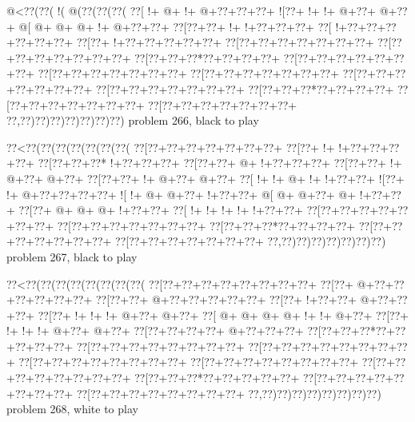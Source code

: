 \vbox{\vbox{\goo
\- @<\0??(\0??(\- !(\- @(\0??(\0??(\0??(
\0??[\- !+\- @+\- !+\- @+\0??+\0??+\0??+
\- ![\0??+\- !+\- !+\- @+\0??+\- @+\0??+
\- @[\- @+\- @+\- @+\- !+\- @+\0??+\0??+
\0??[\0??+\0??+\- !+\- !+\0??+\0??+\0??+
\0??[\- !+\0??+\0??+\0??+\0??+\0??+\0??+
\0??[\0??+\- !+\0??+\0??+\0??+\0??+\0??+
\0??[\0??+\0??+\0??+\0??+\0??+\0??+\0??+
\0??[\0??+\0??+\0??+\0??+\0??+\0??+\0??+
\0??[\0??+\0??+\0??*\0??+\0??+\0??+\0??+
\0??[\0??+\0??+\0??+\0??+\0??+\0??+\0??+
\0??[\0??+\0??+\0??+\0??+\0??+\0??+\0??+
\0??[\0??+\0??+\0??+\0??+\0??+\0??+\0??+
\0??[\0??+\0??+\0??+\0??+\0??+\0??+\0??+
\0??[\0??+\0??+\0??+\0??+\0??+\0??+\0??+
\0??[\0??+\0??+\0??*\0??+\0??+\0??+\0??+
\0??[\0??+\0??+\0??+\0??+\0??+\0??+\0??+
\0??[\0??+\0??+\0??+\0??+\0??+\0??+\0??+
\0??,\0??)\0??)\0??)\0??)\0??)\0??)\0??)
}
\hfil problem 266, black to play\hfil\break
}

\vbox{\vbox{\goo
\0??<\0??(\0??(\0??(\0??(\0??(\0??(\0??(
\0??[\0??+\0??+\0??+\0??+\0??+\0??+\0??+
\0??[\0??+\- !+\- !+\0??+\0??+\0??+\0??+
\0??[\0??+\0??+\0??*\- !+\0??+\0??+\0??+
\0??[\0??+\0??+\- @+\- !+\0??+\0??+\0??+
\0??[\0??+\0??+\- !+\- @+\0??+\- @+\0??+
\0??[\0??+\0??+\- !+\- @+\0??+\- @+\0??+
\0??[\- !+\- !+\- @+\- !+\- !+\0??+\0??+
\- ![\0??+\- !+\- @+\0??+\0??+\0??+\0??+
\- ![\- !+\- @+\- @+\0??+\- !+\0??+\0??+
\- @[\- @+\- @+\0??+\- @+\- !+\0??+\0??+
\0??[\0??+\- @+\- @+\- @+\- !+\0??+\0??+
\0??[\- !+\- !+\- !+\- !+\- !+\0??+\0??+
\0??[\0??+\0??+\0??+\0??+\0??+\0??+\0??+
\0??[\0??+\0??+\0??+\0??+\0??+\0??+\0??+
\0??[\0??+\0??+\0??*\0??+\0??+\0??+\0??+
\0??[\0??+\0??+\0??+\0??+\0??+\0??+\0??+
\0??[\0??+\0??+\0??+\0??+\0??+\0??+\0??+
\0??,\0??)\0??)\0??)\0??)\0??)\0??)\0??)
}
\hfil problem 267, black to play\hfil\break
}

\vbox{\vbox{\goo
\0??<\0??(\0??(\0??(\0??(\0??(\0??(\0??(\0??(
\0??[\0??+\0??+\0??+\0??+\0??+\0??+\0??+\0??+
\0??[\0??+\- @+\0??+\0??+\0??+\0??+\0??+\0??+
\0??[\0??+\0??+\- @+\0??+\0??+\0??+\0??+\0??+
\0??[\0??+\- !+\0??+\0??+\- @+\0??+\0??+\0??+
\0??[\0??+\- !+\- !+\- !+\- @+\0??+\- @+\0??+
\0??[\- @+\- @+\- @+\- @+\- !+\- !+\- @+\0??+
\0??[\0??+\- !+\- !+\- !+\- @+\0??+\- @+\0??+
\0??[\0??+\0??+\0??+\0??+\- @+\0??+\0??+\0??+
\0??[\0??+\0??+\0??*\0??+\0??+\0??+\0??+\0??+
\0??[\0??+\0??+\0??+\0??+\0??+\0??+\0??+\0??+
\0??[\0??+\0??+\0??+\0??+\0??+\0??+\0??+\0??+
\0??[\0??+\0??+\0??+\0??+\0??+\0??+\0??+\0??+
\0??[\0??+\0??+\0??+\0??+\0??+\0??+\0??+\0??+
\0??[\0??+\0??+\0??+\0??+\0??+\0??+\0??+\0??+
\0??[\0??+\0??+\0??*\0??+\0??+\0??+\0??+\0??+
\0??[\0??+\0??+\0??+\0??+\0??+\0??+\0??+\0??+
\0??[\0??+\0??+\0??+\0??+\0??+\0??+\0??+\0??+
\0??,\0??)\0??)\0??)\0??)\0??)\0??)\0??)\0??)
}
\hfil problem 268, white to play\hfil\break
}

